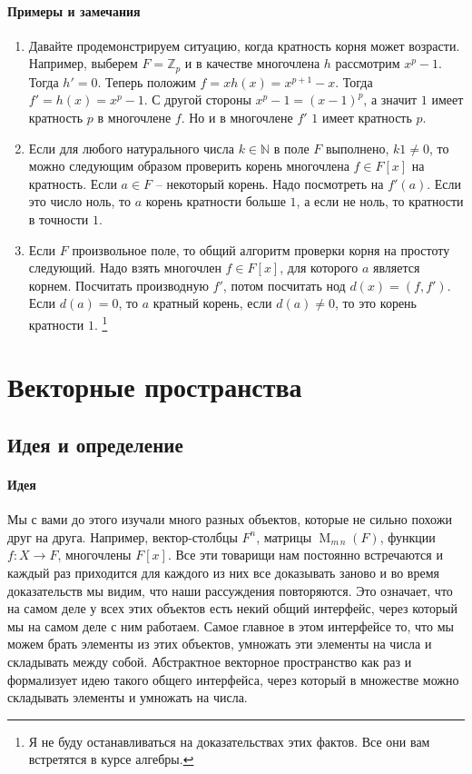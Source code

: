 \paragraph{Примеры и замечания}
\begin{enumerate}
\item
Давайте продемонстрируем ситуацию, когда кратность корня может возрасти.
Например, выберем $F = \mathbb Z_p$ и в качестве многочлена $h$ рассмотрим $x^p - 1$.
Тогда $h' = 0$.
Теперь положим $f = xh(x) = x^{p+1}- x$.
Тогда $f' = h(x) = x^p - 1$.
С другой стороны $x^p - 1 = (x-1)^p$, а значит $1$ имеет кратность $p$ в многочлене $f$.
Но и в многочлене $f'$ $1$ имеет кратность $p$.

\item Если для любого натурального числа $k\in \mathbb N$ в поле $F$ выполнено, $k 1 \neq 0$, то можно следующим образом проверить корень многочлена $f\in F[x]$ на кратность.
Если $a\in F$ -- некоторый корень.
Надо посмотреть на $f'(a)$.
Если это число ноль, то $a$ корень кратности больше $1$, а если не ноль, то кратности в точности $1$.

\item Если $F$ произвольное поле, то общий алгоритм проверки корня на простоту следующий.
Надо взять многочлен $f\in F[x]$, для которого $a$ является корнем.
Посчитать производную $f'$, потом посчитать нод $d(x) = (f, f')$.
Если $d(a) = 0$, то $a$ кратный корень, если $d(a) \neq 0$, то это корень кратности $1$.%
\footnote{Я не буду останавливаться на доказательствах этих фактов.
Все они вам встретятся в курсе алгебры.}
\end{enumerate}



\newpage
\section{Векторные пространства}

\subsection{Идея и определение}

\paragraph{Идея}
Мы с вами до этого изучали много разных объектов, которые не сильно похожи друг на друга.
Например, вектор-столбцы $F^n$, матрицы $\operatorname{M}_{m\,n}(F)$, функции $f\colon X\to F$, многочлены $F[x]$.
Все эти товарищи нам постоянно встречаются и каждый раз приходится для каждого из них все доказывать заново и во время доказательств мы видим, что наши рассуждения повторяются.
Это означает, что на самом деле у всех этих объектов есть некий общий интерфейс, через который мы на самом деле с ним работаем.
Самое главное в этом интерфейсе то, что мы можем брать элементы из этих объектов, умножать эти элементы на числа и складывать между собой.
Абстрактное векторное пространство как раз и формализует идею такого общего интерфейса, через который в множестве можно складывать элементы и умножать на числа.


